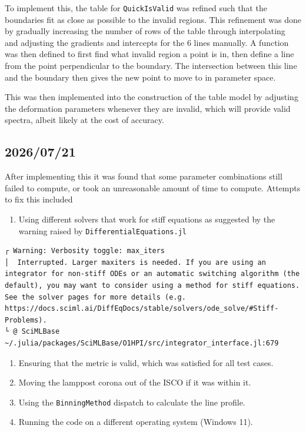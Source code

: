 \documentclass[
  letterpaper,
  DIV=11,
  numbers=noendperiod]{scrreprt}
\providecommand{\tightlist}{%
  \setlength{\itemsep}{0pt}\setlength{\parskip}{0pt}}
\begin{document}
To implement this, the table for \texttt{QuickIsValid} was refined such
that the boundaries fit as close as possible to the invalid regions.
This refinement was done by gradually increasing the number of rows of
the table through interpolating and adjusting the gradients and
intercepts for the 6 lines manually. A function was then defined to
first find what invalid region a point is in, then define a line from
the point perpendicular to the boundary. The intersection between this
line and the boundary then gives the new point to move to in parameter
space.

This was then implemented into the construction of the table model by
adjusting the deformation parameters whenever they are invalid, which
will provide valid spectra, albeit likely at the cost of accuracy.

\subsection{2026/07/21}\label{section-1}

After implementing this it was found that some parameter combinations
still failed to compute, or took an unreasonable amount of time to
compute. Attempts to fix this included

\begin{enumerate}
\def\labelenumi{\arabic{enumi}.}
\tightlist
\item
  Using different solvers that work for stiff equations as suggested by
  the warning raised by \texttt{DifferentialEquations.jl}
\end{enumerate}

\begin{verbatim}
┌ Warning: Verbosity toggle: max_iters 
│  Interrupted. Larger maxiters is needed. If you are using an integrator for non-stiff ODEs or an automatic switching algorithm (the default), you may want to consider using a method for stiff equations. See the solver pages for more details (e.g. https://docs.sciml.ai/DiffEqDocs/stable/solvers/ode_solve/#Stiff-Problems).
└ @ SciMLBase ~/.julia/packages/SciMLBase/O1HPI/src/integrator_interface.jl:679
\end{verbatim}

\begin{enumerate}
\def\labelenumi{\arabic{enumi}.}
\setcounter{enumi}{1}
\tightlist
\item
  Ensuring that the metric is valid, which was satisfied for all test
  cases.
\item
  Moving the lamppost corona out of the ISCO if it was within it.
\item
  Using the \texttt{BinningMethod} dispatch to calculate the line
  profile.
\item
  Running the code on a different operating system (Windows 11).
\end{enumerate}
\end{document}
